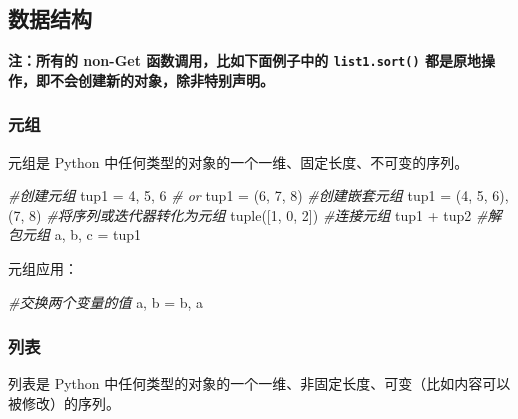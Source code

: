 \documentclass[]{ctexart}
\newenvironment{Shaded}{}{}
\newcommand{\DecValTok}[1]{\textcolor[rgb]{0.25,0.63,0.44}{{#1}}}
\newcommand{\CommentTok}[1]{\textcolor[rgb]{0.38,0.63,0.69}{\textit{{#1}}}}
\newcommand{\OperatorTok}[1]{\textcolor[rgb]{0.40,0.40,0.40}{{#1}}}
\newcommand{\BuiltInTok}[1]{{#1}}
\newcommand{\NormalTok}[1]{{#1}}
\begin{document}
\hypertarget{header-n123}{\subsection{数据结构}\label{header-n123}}

\textbf{注：所有的 non-Get 函数调用，比如下面例子中的
\texttt{list1.sort()} 都是原地操作，即不会创建新的对象，除非特别声明。}

\subsubsection{元组}\label{header-n126}

元组是 Python 中任何类型的对象的一个一维、固定长度、不可变的序列。

\begin{Shaded}
\begin{Highlighting}[]
\CommentTok{#创建元组}
\NormalTok{tup1 }\OperatorTok{=} \DecValTok{4}\NormalTok{, }\DecValTok{5}\NormalTok{, }\DecValTok{6} 
\CommentTok{# or}
\NormalTok{tup1 }\OperatorTok{=} \NormalTok{(}\DecValTok{6}\NormalTok{, }\DecValTok{7}\NormalTok{, }\DecValTok{8}\NormalTok{)}
\CommentTok{#创建嵌套元组}
\NormalTok{tup1 }\OperatorTok{=} \NormalTok{(}\DecValTok{4}\NormalTok{, }\DecValTok{5}\NormalTok{, }\DecValTok{6}\NormalTok{), (}\DecValTok{7}\NormalTok{, }\DecValTok{8}\NormalTok{)}
\CommentTok{#将序列或迭代器转化为元组}
\BuiltInTok{tuple}\NormalTok{([}\DecValTok{1}\NormalTok{, }\DecValTok{0}\NormalTok{, }\DecValTok{2}\NormalTok{])}
\CommentTok{#连接元组}
\NormalTok{tup1 }\OperatorTok{+} \NormalTok{tup2}
\CommentTok{#解包元组}
\NormalTok{a, b, c }\OperatorTok{=} \NormalTok{tup1}
\end{Highlighting}
\end{Shaded}

元组应用：

\begin{Shaded}
\begin{Highlighting}[]
\CommentTok{#交换两个变量的值}
\NormalTok{a, b }\OperatorTok{=} \NormalTok{b, a}
\end{Highlighting}
\end{Shaded}

\subsubsection{列表}\label{header-n133}

列表是 Python
中任何类型的对象的一个一维、非固定长度、可变（比如内容可以被修改）的序列。
\end{document}

